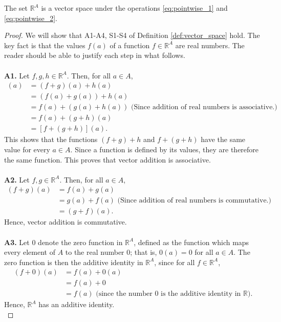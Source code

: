 \documentclass[12pt,letterpaper,reqno]{article}
\numberwithin{equation}{section}
\begin{document}
\begin{prop}\label{prop:r_a_is_a_vector_space}
The set $\mathbb{R}^A$ is a vector space under the operations \eqref{eq:pointwise_1} and \eqref{eq:pointwise_2}.
\end{prop}

\begin{proof}
We will show that A1-A4, S1-S4 of Definition \ref{def:vector_space} hold. The key fact is that the values $f(a)$ of a function $f \in \mathbb{R}^A$ are real numbers. The reader should be able to justify each step in what follows.  \\
\\
{\bf A1.} Let $f,g,h \in \mathbb{R}^A$. Then, for all $a \in A$,
\begin{align*}
	[(f+g)+h](a)&=(f+g)(a)+h(a) \\
	&=(f(a)+g(a))+h(a) \\
	&=f(a)+(g(a)+h(a)) \text{ (Since addition of real numbers is associative.)}\\
	&=f(a)+(g+h)(a) \\
	&=[f+(g+h)](a).
\end{align*}
This shows that the functions $(f+g)+h$ and $f+(g+h)$ have the same value for every $a \in A$. Since a function is defined by its values, they are therefore the same function. This proves that vector addition is associative. \\
\\
{\bf A2.} Let $f,g \in \mathbb{R}^A$. Then, for all $a \in A$,
\begin{align*}
	(f+g)(a)&=f(a)+g(a) \\
	&=g(a)+f(a) \text{ (Since addition of real numbers is commutative.)} \\
	&=(g+f)(a).
\end{align*}
Hence, vector addition is commutative. \\
\\
{\bf A3.} Let $0$ denote the zero function in $\mathbb{R}^A$, defined as the function which maps every element of $A$ to the real number $0$; that is, $0(a)=0$ for all $a \in A$. The zero function is then the additive identity in $\mathbb{R}^A$, since for all $f \in \mathbb{R}^A$,
\begin{align*}
	(f+0)(a)&=f(a)+0(a) \\
	&=f(a)+0 \\
	&=f(a) \text{ (since the number 0 is the additive identity in $\mathbb{R}$).}
\end{align*} 
Hence, $\mathbb{R}^A$ has an additive identity. \\

\end{proof}
\end{document}
